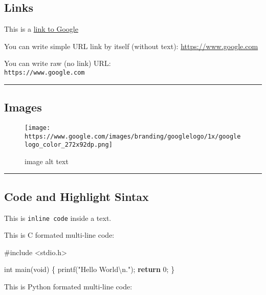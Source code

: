 \documentclass[]{article}
\newenvironment{Shaded}{}{}
\newcommand{\DataTypeTok}[1]{\textcolor[rgb]{0.56,0.13,0.00}{#1}}
\newcommand{\DecValTok}[1]{\textcolor[rgb]{0.25,0.63,0.44}{#1}}
\newcommand{\SpecialCharTok}[1]{\textcolor[rgb]{0.25,0.44,0.63}{#1}}
\newcommand{\StringTok}[1]{\textcolor[rgb]{0.25,0.44,0.63}{#1}}
\newcommand{\ImportTok}[1]{#1}
\newcommand{\ControlFlowTok}[1]{\textcolor[rgb]{0.00,0.44,0.13}{\textbf{#1}}}
\newcommand{\PreprocessorTok}[1]{\textcolor[rgb]{0.74,0.48,0.00}{#1}}
\newcommand{\NormalTok}[1]{#1}
\begin{document}
\subsection{Links}\label{links}

This is a \href{https://www.google.com}{link to Google}

You can write simple URL link by itself (without text):
\url{https://www.google.com}

You can write raw (no link) URL:\\
\texttt{https://www.google.com}

\begin{center}\rule{0.5\linewidth}{\linethickness}\end{center}

\subsection{Images}\label{images}

\begin{figure}
\centering
\texttt{[image: https://www.google.com/images/branding/googlelogo/1x/googlelogo\_color\_272x92dp.png]}
\caption{image alt text}
\end{figure}

\begin{center}\rule{0.5\linewidth}{\linethickness}\end{center}

\subsection{Code and Highlight Sintax}\label{code-and-highlight-sintax}

This is \texttt{inline\ code} inside a text.

This is C formated multi-line code:

\begin{Shaded}
\begin{Highlighting}[]
\PreprocessorTok{#include }\ImportTok{<stdio.h>}

\DataTypeTok{int}\NormalTok{ main(}\DataTypeTok{void}\NormalTok{)}
\NormalTok{\{}
\NormalTok{    printf(}\StringTok{"Hello World}\SpecialCharTok{\textbackslash{}n}\StringTok{."}\NormalTok{);}
    \ControlFlowTok{return} \DecValTok{0}\NormalTok{;}
\NormalTok{\}}
\end{Highlighting}
\end{Shaded}

This is Python formated multi-line code:
\end{document}
